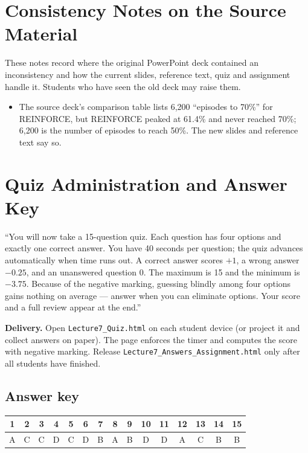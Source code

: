 \documentclass[11pt]{article}
\begin{document}
\section{Consistency Notes on the Source Material}These notes record where the original PowerPoint deck contained an inconsistency and how the current slides, reference text, quiz and assignment handle it. Students who have seen the old deck may raise them.\begin{itemize}\item The source deck's comparison table lists 6,200 ``episodes to 70\%'' for REINFORCE, but REINFORCE peaked at 61.4\% and never reached 70\%; 6,200 is the number of episodes to reach 50\%. The new slides and reference text say so.\end{itemize}

\section{Quiz Administration and Answer Key}

\begin{sayit}``You will now take a 15-question quiz. Each question has four options and exactly one correct answer. You have 40 seconds per question; the quiz advances automatically when time runs out. A correct answer scores $+1$, a wrong answer $-0.25$, and an unanswered question 0. The maximum is 15 and the minimum is $-3.75$. Because of the negative marking, guessing blindly among four options gains nothing on average --- answer when you can eliminate options. Your score and a full review appear at the end.''\end{sayit}

\textbf{Delivery.} Open \texttt{Lecture7\_Quiz.html} on each student device (or project it and collect answers on paper). The page enforces the timer and computes the score with negative marking. Release \texttt{Lecture7\_Answers\_Assignment.html} only after all students have finished.

\subsection*{Answer key}\begin{center}\small\renewcommand{\arraystretch}{1.3}\begin{tabular}{|c|c|c|c|c|c|c|c|c|c|c|c|c|c|c|}\hline \textbf{1} & \textbf{2} & \textbf{3} & \textbf{4} & \textbf{5} & \textbf{6} & \textbf{7} & \textbf{8} & \textbf{9} & \textbf{10} & \textbf{11} & \textbf{12} & \textbf{13} & \textbf{14} & \textbf{15}\\\hline A & C & C & D & C & D & B & A & B & D & D & A & C & B & B\\\hline\end{tabular}\end{center}
\end{document}
